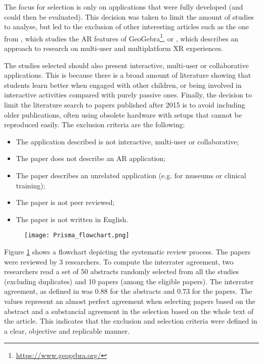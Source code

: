 The focus for selection is only on applications that were fully developed (and could then be evaluated). This decision was taken to limit the amount of studies to analyse, but led to the exclusion of other interesting articles such as the one from \cite{osypova2021improving}, which studies the AR features of GeoGebra\footnote{\url{https://www.geogebra.org/}}, or \citep{tumler2022multi}, which describes an approach to research on multi-user and multiplatform XR experiences.

The studies selected should also present interactive, multi-user or collaborative applications. This is because there is a broad amount of literature showing that students learn better when engaged with other children, or being involved in interactive activities compared with purely passive ones. Finally, the decision to limit the literature search to papers published after 2015 is to avoid including older publications, often using obsolete hardware with setups that cannot be reproduced easily. The exclusion criteria are the following:

\begin{itemize}
    \item The application described is not interactive, multi-user or collaborative;
    \item The paper does not describe an AR application;
    \item The paper describes an unrelated application (e.g. for museums or clinical training);
    \item The paper is not peer reviewed;
    \item The paper is not written in English.
\end{itemize}

\begin{figure}[ht!]	
	\begin{center}
	\texttt{[image: Prisma\_flowchart.png]}
	\captionsetup{font=small}
	\caption{\fontsize{10pt}{11pt}}
	\label{fig:flowchart}
    \end{center}
\end{figure}

Figure \ref{fig:flowchart} shows a flowchart depicting the systematic review process. The \papersToRead papers were reviewed by 3 researchers. To compute the interrater agreement, two researchers read a set of 50 abstracts randomly selected from all the studies (excluding duplicates) and 10 papers (among the \papersToRead eligible papers). The interrater agreement, as defined in \cite{cohen1960coefficient} was $0.88$ for the abstracts and $0.73$ for the papers. The values represent\citep{mchugh2012interrater} an almost perfect agreement when selecting papers based on the abstract and a substancial agreement in the selection based on the whole text of the article. This indicates that the exclusion and selection criteria were defined in a clear, objective and replicable manner.


